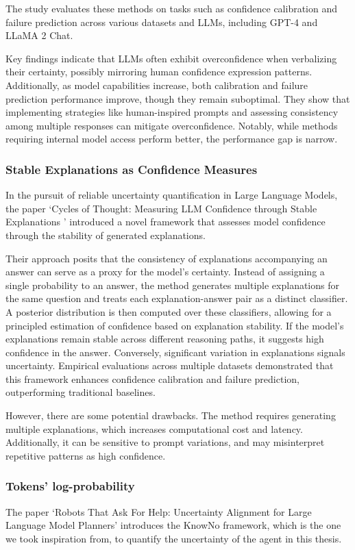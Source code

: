 The study evaluates these methods on tasks such as confidence calibration and failure
prediction across various datasets and LLMs, including GPT-4 and LLaMA 2 Chat.

Key findings indicate that LLMs often exhibit overconfidence when verbalizing
their certainty, possibly mirroring human confidence expression patterns.
Additionally, as model capabilities increase, both calibration and failure
prediction performance improve, though they remain suboptimal. They show that
implementing strategies like human-inspired prompts and assessing consistency
among multiple responses can mitigate overconfidence. Notably, while methods
requiring internal model access perform better, the performance gap is narrow.

\subsubsection{Stable Explanations as Confidence Measures}
In the pursuit of reliable uncertainty quantification in Large Language Models,
the paper `Cycles of Thought: Measuring LLM Confidence through Stable
Explanations ' \cite{becker2024cyclesthoughtmeasuringllm} introduced a novel
framework that assesses model confidence through the stability of generated
explanations.

Their approach posits that the consistency of explanations accompanying an
answer can serve as a proxy for the model's certainty. Instead of assigning a single
probability to an answer, the method generates multiple explanations for the
same question and treats each explanation-answer pair as a distinct classifier. A
posterior distribution is then computed over these classifiers, allowing for a
principled estimation of confidence based on explanation stability. If the model's
explanations remain stable across different reasoning paths, it suggests high
confidence in the answer. Conversely, significant variation in explanations
signals uncertainty. Empirical evaluations across multiple datasets demonstrated
that this framework enhances confidence calibration and failure prediction,
outperforming traditional baselines.

However, there are some potential drawbacks. The method requires generating
multiple explanations, which increases computational cost and latency.
Additionally, it can be sensitive to prompt variations, and may misinterpret
repetitive patterns as high confidence.

\subsubsection{Tokens' log-probability}
\label{ssub:tokens_log_probability} The paper `Robots That Ask For Help:
Uncertainty Alignment for Large Language Model Planners' \cite{ren2023robotsaskhelpuncertainty}
introduces the KnowNo framework, which is the one we took inspiration from, to quantify
the uncertainty of the agent in this thesis.

